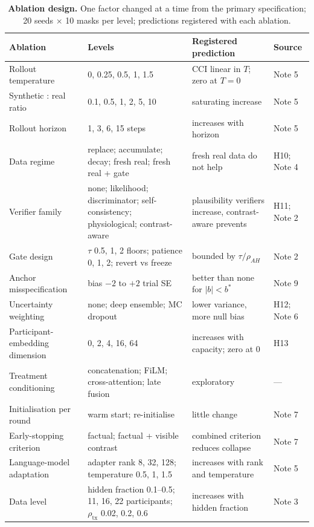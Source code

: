 \documentclass[11pt,a4paper]{article}
\newcommand{\CCI}{\mathrm{CCI}}
\begin{document}
\begin{table}[!htbp]\centering\scriptsize
\caption{\textbf{Ablation design.} One factor changed at a time from the primary specification; 20 seeds $\times$ 10 masks per level; predictions registered with each ablation.}
\begin{tabularx}{\textwidth}{@{}p{2.6cm} Y Y p{1.4cm}@{}}\toprule
Ablation & Levels & Registered prediction & Source\\\midrule
Rollout temperature & 0, 0.25, 0.5, 1, 1.5 & $\CCI$ linear in $T$; zero at $T=0$ & Note 5\\
Synthetic : real ratio & 0.1, 0.5, 1, 2, 5, 10 & saturating increase & Note 5\\
Rollout horizon & 1, 3, 6, 15 steps & increases with horizon & Note 5\\
Data regime & replace; accumulate; decay; fresh real; fresh real + gate & fresh real data do not help & H10; Note 4\\
Verifier family & none; likelihood; discriminator; self-consistency; physiological; contrast-aware & plausibility verifiers increase, contrast-aware prevents & H11; Note 2\\
Gate design & $\tau$ 0.5, 1, 2 floors; patience 0, 1, 2; revert vs freeze & bounded by $\tau/\rho_{AH}$ & Note 2\\
Anchor misspecification & bias $-2$ to $+2$ trial SE & better than none for $|b|<b^*$ & Note 9\\
Uncertainty weighting & none; deep ensemble; MC dropout & lower variance, more null bias & H12; Note 6\\
Participant-embedding dimension & 0, 2, 4, 16, 64 & increases with capacity; zero at 0 & H13\\
Treatment conditioning & concatenation; FiLM; cross-attention; late fusion & exploratory & ---\\
Initialisation per round & warm start; re-initialise & little change & Note 7\\
Early-stopping criterion & factual; factual + visible contrast & combined criterion reduces collapse & Note 7\\
Language-model adaptation & adapter rank 8, 32, 128; temperature 0.5, 1, 1.5 & increases with rank and temperature & Note 5\\
Data level & hidden fraction 0.1--0.5; 11, 16, 22 participants; $\rho_{\mathrm{tx}}$ 0.02, 0.2, 0.6 & increases with hidden fraction & Note 3\\
\bottomrule\end{tabularx}
\end{table}
\end{document}
